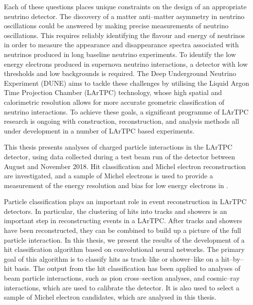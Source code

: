 Each of these questions places unique constraints on the design of an
appropriate neutrino detector. The discovery of a matter anti--matter asymmetry
in neutrino oscillations could be answered by making precise measurements of
neutrino oscillations. This requires reliably identifying the flavour and energy
of neutrinos in order to measure the appearance and disappearance spectra
associated with neutrinos produced in long baseline neutrino experiments. To
identify the low energy electrons produced in supernova neutrino interactions, a
detector with low thresholds and low backgrounds is required. The Deep
Underground Neutrino Experiment (DUNE) aims to tackle these challenges by
utilising the Liquid Argon Time Projection Chamber (LArTPC) technology, whose
high spatial and calorimetric resolution allows for more accurate geometric
classification of neutrino interactions. To achieve these goals, a significant 
programme of LArTPC research is ongoing with construction, reconstruction, and 
analysis methods all under development in a number of LArTPC based 
experiments\cite{Acciarri:2016smi, Cavanna:2014iqa, Antonello:2015lea, 
Abi:2017aow}. 

This thesis presents analyses of charged particle interactions in the
\protodune{} LArTPC detector, using data collected during a test beam run of the
detector between August and November 2018. Hit classification and Michel 
electron reconstruction are investigated, and a sample of Michel electrons is 
used to provide a measurement of the energy resolution and bias for low energy 
electrons in \protodune{}.

Particle classification plays an important role in event reconstruction in 
LArTPC detectors. In particular, the clustering of hits into tracks and 
showers is an important step in reconstructing events in a LArTPC. After tracks
and showers have been reconstructed, they can be combined to build up a picture
of the full particle interaction. In this thesis, we present the results of the 
development of a hit classification algorithm based on convolutional neural
networks. The primary goal of this algorithm is to classify hits as 
track--like or shower--like on a hit--by--hit basis. The output from the hit 
classification has been applied to analyses of beam particle interactions, 
such as pion cross--section analyses, and cosmic--ray interactions, which 
are used to calibrate the \protodune{} detector. It is also used to select a 
sample of Michel electron candidates, which are analysed in this thesis.

